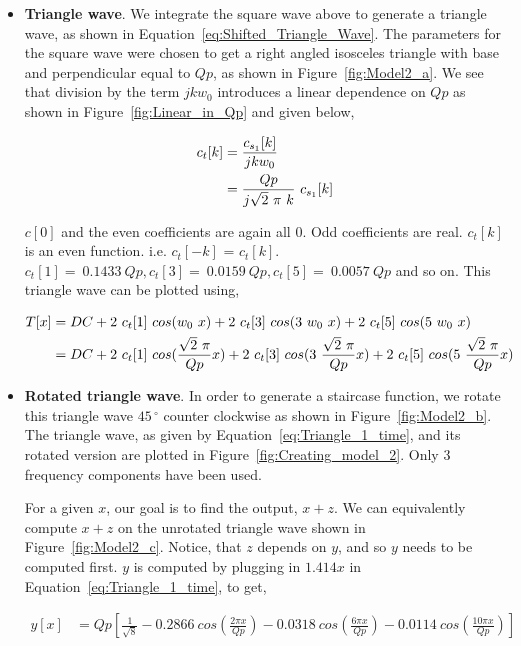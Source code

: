 \documentclass[12pt]{article}
\begin{document}
\begin{itemize}
\item \textbf{Triangle wave}.  We integrate the square wave above to generate a triangle wave, as shown in Equation~\ref{eq:Shifted_Triangle_Wave}.  The parameters for the square wave were chosen to get a right angled isosceles triangle with base and perpendicular equal to $Qp$, as shown in Figure~\ref{fig:Model2_a}.  We see that division by the term $jkw_0$ introduces a linear dependence on $Qp$ as shown in Figure~\ref{fig:Linear_in_Qp} and given below,

		\begin{align}
		c_t[k] &= \frac{c_{s_1}[k]}{jkw_0}\notag\\
		       & =  \frac{Qp}{j \sqrt{2} \ \pi \ k}  \ c_{s_1}[k]
		\label{eq:Triangle_1_ck}
		\end{align}
		
$c[0]$ and the even coefficients are again all $0$.  Odd coefficients are real.  $c_{t}[k]$ is an even function. i.e. $c_{t}[-k]$ = $c_{t}[k]$.  $c_{t}[1]= \ 0.1433 \ Qp, c_{t}[3]= \ 0.0159 \ Qp, c_{t}[5]= \ 0.0057 \ Qp$ and so on.  This triangle wave can be plotted using,

		\begin{align}
		T[x] &= DC + 2 \ c_t[1] \ cos( w_0 \ x) + 2 \ c_t[3] \ cos(3 \ w_0 \ x) + 2 \ c_t[5] \ cos(5 \ w_0 \ x)\notag\\
		 			 &= DC + 2 \ c_t[1] \ cos( \frac{\sqrt{2} \ \pi}{Qp}x) + 2 \ c_t[3] \ cos(3 \ \frac{\sqrt{2}  \  \pi}{Qp}x) + 2 \ c_t[5] \ cos(5 \ \frac{\sqrt{2}  \ \pi}{Qp}x)
		\label{eq:Triangle_1_time}
		\end{align}
							
\item \textbf{Rotated triangle  wave}.  In order to generate a staircase function, we rotate this triangle wave $45\,^{\circ}$ counter clockwise as shown in Figure~\ref{fig:Model2_b}.  The triangle wave, as given by Equation~\ref{eq:Triangle_1_time}, and its rotated version are plotted in Figure~\ref{fig:Creating_model_2}.  Only 3 frequency components have been used.  

For a given $x$, our goal is to find the output, $x+z$.  We can equivalently compute $x+z$ on the unrotated triangle wave shown in Figure~\ref{fig:Model2_c}.  Notice, that $z$ depends on $y$, and so $y$ needs to be computed first.  $y$ is computed by plugging in $1.414x$ in Equation~\ref{eq:Triangle_1_time}, to get,
 
		\begin{align}
		y[x] &= Qp \left[\frac{1}{\sqrt{8}} - 0.2866 \ cos( \frac{2\pi x}{Qp}) 
							 - 0.0318 \ cos( \frac{6\pi x}{Qp}) 
							 - 0.0114 \ cos( \frac{10\pi x}{Qp})\right] 
		\label{eq:y}
		\end{align}
		

\end{itemize}
\end{document}
